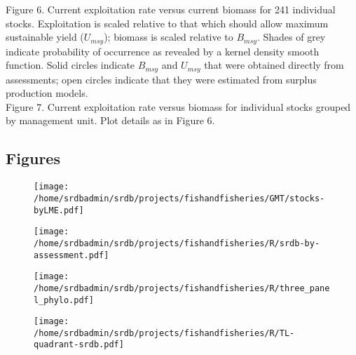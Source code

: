 \noindent Figure 6. Current exploitation rate versus current biomass for 241
individual stocks. Exploitation is scaled relative to that which
should allow maximum sustainable yield ($U_{msy}$); biomass is scaled
relative to $B_{msy}$. Shades of grey indicate probability of occurrence as
revealed by a kernel density smooth function. Solid circles indicate
$B_{msy}$ and $U_{msy}$ that were obtained directly from assessments; open circles
indicate that they were estimated from surplus production models.\\ 

\noindent Figure 7. Current exploitation rate versus biomass for
individual stocks grouped by management unit. Plot details as in
Figure 6.\\ 


\newpage
\subsection*{Figures}

\begin{figure}
\begin{center}
\texttt{[image: /home/srdbadmin/srdb/projects/fishandfisheries/GMT/stocks-byLME.pdf]}
\end{center}
\caption{ }\label{fig:lmes}
\end{figure}

\begin{figure}
\begin{center}
\texttt{[image: /home/srdbadmin/srdb/projects/fishandfisheries/R/srdb-by-assessment.pdf]} %
\end{center}
\caption{ }\label{fig:taxo:srdb}
\end{figure}


\begin{figure}
\begin{center}
\texttt{[image: /home/srdbadmin/srdb/projects/fishandfisheries/R/three\_panel\_phylo.pdf]} %
\end{center}
\caption{ }\label{fig:taxo:threepanel}
\end{figure}

\begin{figure}
\begin{center}
\texttt{[image: /home/srdbadmin/srdb/projects/fishandfisheries/R/TL-quadrant-srdb.pdf]}
\end{center}
\caption{ }\label{fig:TL}
\end{figure}

